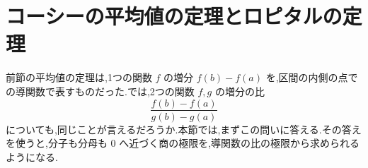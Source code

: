 \section{コーシーの平均値の定理とロピタルの定理}\label{節:ロピタル}
前節の平均値の定理は,1つの関数 $f$ の増分 $f(b)-f(a)$ を,区間の内側の点での導関数で表すものだった.では,2つの関数 $f,g$ の増分の比
\[
 \frac{f(b)-f(a)}{g(b)-g(a)}
\]
についても,同じことが言えるだろうか.本節では,まずこの問いに答える.その答えを使うと,分子も分母も $0$ へ近づく商の極限を,導関数の比の極限から求められるようになる.

%
%
%
%
